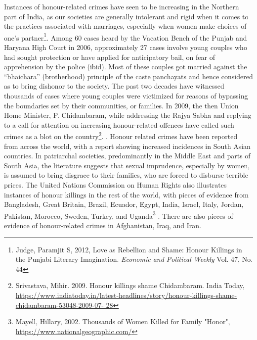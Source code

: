 \setcounter{figure}{0}
\setcounter{table}{0}
\setcounter{footnote}{0}

\label{2016-art3}

\vspace{-.3cm}




\begin{multicols}{2}


\noi
Instances of honour-related crimes have seen to be increasing in the Northern part of
India, as our societies are generally intolerant and rigid when it comes to the practices
associated with marriages, especially when women make choices of one’s partner\footnote{Judge, Paramjit S, 2012, Love as Rebellion and Shame: Honour Killings in the Punjabi Literary
Imagination. \textit{Economic and Political Weekly} Vol. 47, No. 44}. Among 60 cases heard by the Vacation Bench of the Punjab and Haryana High Court
in 2006, approximately 27 cases involve young couples who had sought protection or
have applied for anticipatory bail, on fear of apprehension by the police (ibid). Most of
these couples got married against the “bhaichara” (brotherhood) principle of the caste
panchayats and hence considered as to bring dishonor to the society. The past two
decades have witnessed thousands of cases where young couples were victimized for
reasons of bypassing the boundaries set by their communities, or families. In 2009, the
then Union Home Minister, P. Chidambaram, while addressing the Rajya Sabha and
replying to a call for attention on increasing honour-related offences have called such
crimes as a blot on the country\footnote{Srivastava, Mihir. 2009. Honour killings shame Chidambaram. India Today,
\url{https://www.indiatoday.in/latest-headlines/story/honour-killings-shame-chidambaram-53048-2009-07-
28}}.
.
\noi
Honour related crimes have been reported from across the world, with a report showing
increased incidences in South Asian countries. In patriarchal societies, predominantly
in the Middle East and parts of South Asia, the literature suggests that sexual
imprudence, especially by women, is assumed to bring disgrace to their families, who
are forced to disburse terrible prices. The United Nations Commission on Human
Rights also illustrates instances of honour killings in the rest of the world, with pieces
of evidence from Bangladesh, Great Britain, Brazil, Ecuador, Egypt, India, Israel, Italy,
Jordan, Pakistan, Morocco, Sweden, Turkey, and Uganda\footnote{Mayell, Hillary, 2002. Thousands of Women Killed for Family "Honor",
\url{https://www.nationalgeographic.com/}}
. There are also pieces of
evidence of honour-related crimes in Afghanistan, Iraq, and Iran.


\end{multicols}
